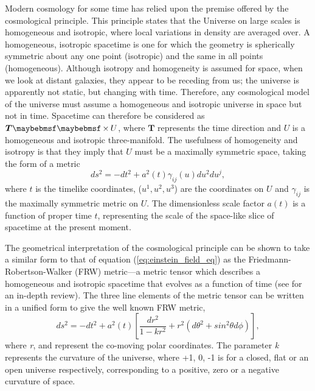 Modern cosmology for some time has relied upon the premise offered by the cosmological principle. This principle states that the Universe on large scales is homogeneous and isotropic, where local variations in density are averaged over. A homogeneous, isotropic spacetime is one for which the geometry is spherically symmetric about any one point (isotropic) and the same in all points (homogeneous). Although isotropy and homogeneity is assumed for space, when we look at distant galaxies, they appear to be receding from us; the universe is apparently not static, but changing with time. Therefore, any cosmological model of the universe must assume a homogeneous and isotropic universe in space but not in time. Spacetime can therefore be considered as $\boldsymbol{T} \cross U$, where $\boldsymbol{T}$ represents the time direction and $U$ is a homogeneous and isotropic three-manifold. The usefulness of homogeneity and isotropy is that they imply that $U$ must be a maximally symmetric space, taking the form of a metric
%
\begin{equation}
    ds^2 = -dt^2 + a^2(t)\gamma_{ij}(u)du^2du^j,  
\end{equation}
%
where $t$ is the timelike coordinates, ($u^1, u^2, u^3$) are the coordinates on $U$ and $\gamma_{ij}$ is the maximally symmetric metric on $U$. The dimensionless scale factor $a(t)$ is a function of proper time $t$, representing the scale of the space-like slice of spacetime at the present moment.

The geometrical interpretation of the cosmological principle can be shown to take a similar form to that of equation (\ref{eq:einstein_field_eq}) as the Friedmann-Robertson-Walker (FRW) metric---a metric tensor which describes a homogeneous and isotropic spacetime that evolves as a function of time (see \cite{Modern_Cosmology, Gravity} for an in-depth review). The three line elements of the metric tensor can be written in a unified form to give the well known FRW metric,
%
\begin{equation}
  ds^2 = -dt^2 + a^2(t) \left[ \frac{dr^2}{1 - kr^2} +r^2(d\theta^2 + sin^2\theta d\phi) \right],
\end{equation}
%
where \textit{r}, \theta and \phi represent the co-moving polar coordinates. The parameter \textit{k} represents the curvature of the universe, where +1, 0, -1 is for a closed, flat or an open universe respectively, corresponding to a positive, zero or a negative curvature of space.

